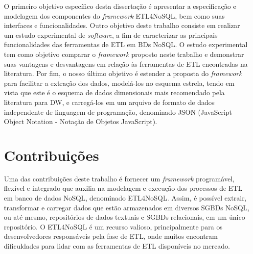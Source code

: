 O primeiro objetivo específico desta dissertação é apresentar a especificação e modelagem dos componentes do \textit{framework} ETL4NoSQL, bem como suas interfaces e funcionalidades. Outro objetivo deste trabalho consiste em realizar um estudo experimental de \textit{software}, a fim de caracterizar as principais funcionalidades das ferramentas de ETL em BDs NoSQL. O estudo experimental tem como objetivo comparar o \textit{framework} proposto neste trabalho e demonstrar suas vantagens e desvantagens em relação às ferramentas de ETL encontradas na literatura. Por fim, o nosso último objetivo é estender a proposta do \textit{framework} para facilitar a extração dos dados, modelá-los no esquema estrela, tendo em vista que este é o esquema de dados dimensionais mais recomendado pela literatura para DW, e carregá-los em um arquivo de formato de dados independente de linguagem de programação, denominado JSON (JavaScript Object Notation - Notação de Objetos JavaScript).


\section{Contribuições}

Uma das contribuições deste trabalho é fornecer um \textit{framework} programável, flexível e integrado que auxilia na modelagem e execução dos processos de ETL em banco de dados NoSQL, denominado ETL4NoSQL. Assim, é possível extrair, transformar e carregar dados que estão armazenados em diversos SGBDs NoSQL, ou até mesmo, repositórios de dados textuais e SGBDs relacionais, em um único repositório. O ETL4NoSQL é um recurso valioso, principalmente para os desenvolvedores responsáveis pela fase de ETL, onde muitos encontram dificuldades para lidar com as ferramentas de ETL disponíveis no mercado. 

